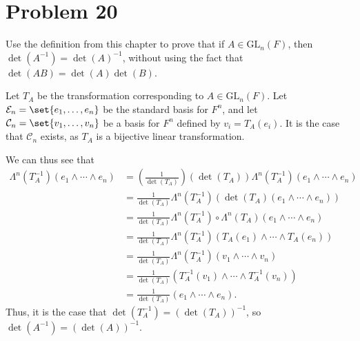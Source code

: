 \documentclass[12pt]{mypackage}
\begin{document}
\section{Problem 20}%
\begin{problem}
  Use the definition from this chapter to prove that if $A\in \text{GL}_{n}\left(F\right)$, then $\det\left(A^{-1}\right) = \det\left(A\right)^{-1}$, without using the fact that $\det\left(AB\right) = \det\left(A\right)\det\left(B\right)$.
\end{problem}
\begin{solution}
  Let $T_A$ be the transformation corresponding to $A\in \text{GL}_{n}\left(F\right)$. Let $\mathcal{E}_n = \set{e_1,\dots,e_n}$ be the standard basis for $F^n$, and let $\mathcal{C}_n = \set{v_1,\dots,v_n}$ be a basis for $F^n$ defined by $v_i = T_A\left(e_i\right)$. It is the case that $\mathcal{C}_n$ exists, as $T_A$ is a bijective linear transformation.\newline

  We can thus see that
  \begin{align*}
    \Lambda^{n}\left(T_A^{-1}\right)\left(e_1\wedge\cdots\wedge e_n\right) &= \left(\frac{1}{\det\left(T_A\right)}\right) \left(\det\left(T_A\right)\right)\Lambda^{n}\left(T_A^{-1}\right)\left(e_1\wedge\cdots\wedge e_n\right)\\
                                                                           &= \frac{1}{\det\left(T_A\right)}\Lambda^{n}\left(T_A^{-1}\right)\left(\det\left(T_A\right)\left(e_1\wedge\cdots\wedge e_n\right)\right)\\
                                                                           &= \frac{1}{\det\left(T_A\right)}\Lambda^{n}\left(T_A^{-1}\right)\circ \Lambda^{n}\left(T_A\right)\left(e_1\wedge\cdots\wedge e_n\right)\\
                                                                           &= \frac{1}{\det\left(T_A\right)}\Lambda^{n}\left(T_A^{-1}\right)\left(T_A\left(e_1\right)\wedge\cdots\wedge T_A\left(e_n\right)\right)\\
                                                                           &= \frac{1}{\det\left(T_A\right)}\Lambda^{n}\left(T_A^{-1}\right)\left(v_1\wedge\cdots\wedge v_n\right)\\
                                                                           &= \frac{1}{\det\left(T_A\right)} \left(T_{A}^{-1}\left(v_1\right)\wedge\cdots\wedge T_A^{-1}\left(v_n\right)\right)\\
                                                                           &= \frac{1}{\det\left(T_A\right)}\left(e_1\wedge\cdots\wedge e_n\right).
  \end{align*}
  Thus, it is the case that $\det\left(T_A^{-1}\right) = \left(\det\left(T_A\right)\right)^{-1}$, so $\det\left(A^{-1}\right) = \left(\det\left(A\right)\right)^{-1}$.
\end{solution}
\end{document}
